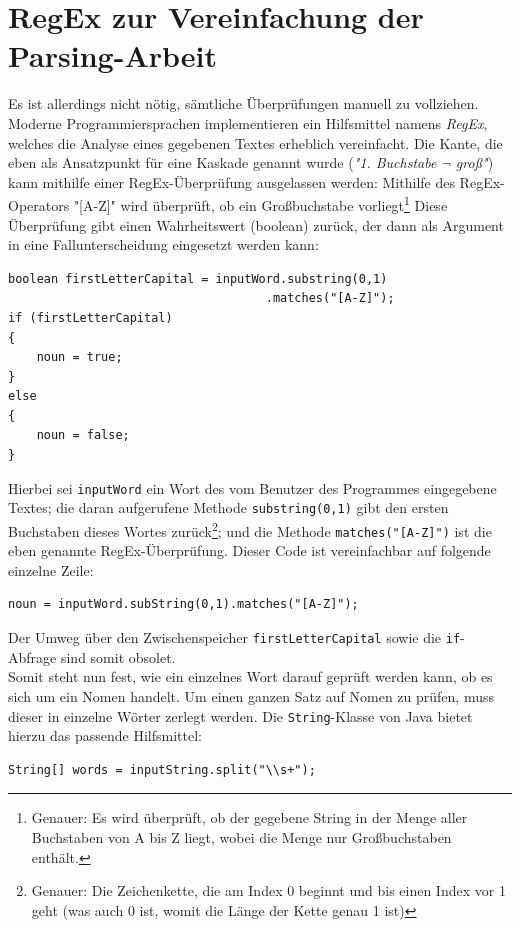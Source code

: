 \documentclass[12pt,twoside]{article}
\theoremstyle{plain}
\theoremstyle{definition}
\theoremstyle{remark}
\begin{document}
\section{RegEx zur Vereinfachung der Parsing-Arbeit}
\label{sec:regex}
Es ist allerdings nicht nötig, sämtliche Überprüfungen manuell zu vollziehen.
Moderne Programmiersprachen implementieren ein Hilfsmittel namens \textit{RegEx}, welches die Analyse eines gegebenen Textes erheblich vereinfacht.
Die Kante, die eben als Ansatzpunkt für eine Kaskade genannt wurde (\textit{"1. Buchstabe $\lnot$ groß"}) kann mithilfe einer RegEx-Überprüfung ausgelassen werden: Mithilfe des RegEx-Operators "[A-Z]" wird überprüft, ob ein Großbuchstabe vorliegt\footnote{Genauer: Es wird überprüft, ob der gegebene String in der Menge aller Buchstaben von A bis Z liegt, wobei die Menge nur Großbuchstaben enthält.}
Diese Überprüfung gibt einen Wahrheitswert (boolean) zurück, der dann als Argument in eine Fallunterscheidung eingesetzt werden kann:
\begin{lstlisting}[caption=Überprüfung des ersten Buchstabens (lang)]
boolean firstLetterCapital = inputWord.substring(0,1)
									.matches("[A-Z]");
if (firstLetterCapital)
{
	noun = true;
}
else
{
	noun = false;
}
\end{lstlisting}
Hierbei sei \texttt{inputWord} ein Wort des vom Benutzer des Programmes eingegebene Textes; die daran aufgerufene Methode \texttt{substring(0,1)} gibt den ersten Buchstaben dieses Wortes zurück\footnote{Genauer: Die Zeichenkette, die am Index 0 beginnt und bis einen Index vor 1 geht (was auch 0 ist, womit die Länge der Kette genau 1 ist)}; und die Methode \texttt{matches("[A-Z]")} ist die eben genannte RegEx-Überprüfung.
Dieser Code ist vereinfachbar auf folgende einzelne Zeile:
\begin{lstlisting}[caption=Überprüfung des ersten Buchstabens (kurz)]
noun = inputWord.subString(0,1).matches("[A-Z]");
\end{lstlisting}
Der Umweg über den Zwischenspeicher \texttt{firstLetterCapital} sowie die \texttt{if}-Abfrage sind somit obsolet.\\
Somit steht nun fest, wie ein einzelnes Wort darauf geprüft werden kann, ob es sich um ein Nomen handelt.
Um einen ganzen Satz auf Nomen zu prüfen, muss dieser in einzelne Wörter zerlegt werden.
Die \texttt{String}-Klasse von Java bietet hierzu das passende Hilfsmittel:
\begin{lstlisting}[caption=Teilen eines Strings jedem Vorkommen von einem oder mehr Leerzeichen]
String[] words = inputString.split("\\s+");
\end{lstlisting}
\end{document}
